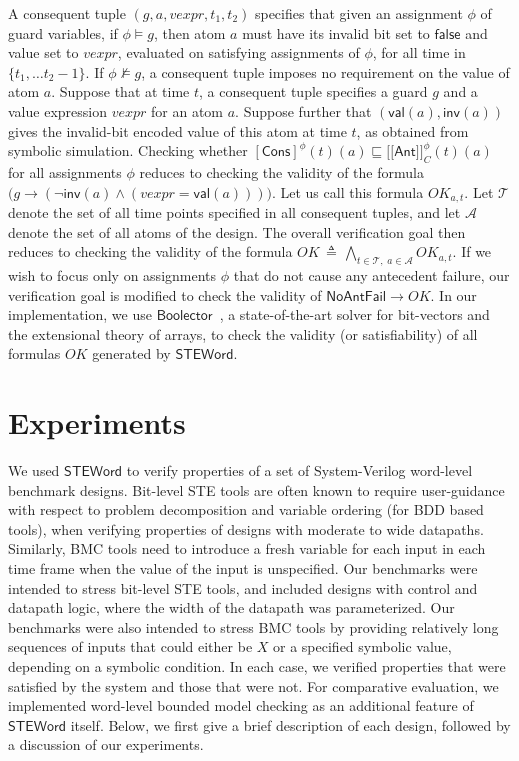 \documentclass{llncs}
\newcommand{\val}{\ensuremath{\mathsf{val}}}
\newcommand{\inv}{\ensuremath{\mathsf{inv}}}
\newcommand{\isdef}{\ensuremath{\,\triangleq\,}}
\newcommand{\lsem}{\ensuremath{[\![}}
\newcommand{\rsem}{\ensuremath{]\!]}}
\newcommand{\ant}{\ensuremath{\mathsf{Ant}}}
\newcommand{\NoAntFail}{\ensuremath{\mathsf{NoAntFail}}}
\newcommand{\cons}{\ensuremath{\mathsf{Cons}}}
\newcommand{\steword}{\ensuremath{\mathsf{STEWord}}}
\newcommand{\Boolector}{\ensuremath{\mathsf{Boolector}}}
\newcommand{\false}{\ensuremath{\mathsf{false}}}
\newcommand{\mc}[1]{\ensuremath{\mathcal{{#1}}}}
\begin{document}
A consequent tuple $(g, a, vexpr, t_1, t_2)$ specifies that given an
assignment $\phi$ of guard variables, if $\phi \models g$, then atom
$a$ must have its invalid bit set to ${\false}$ and value set to
$vexpr$, evaluated on satisfying assignments of $\phi$, for all time
in $\{t_1, \ldots t_2 - 1\}$.  If $\phi \not\models g$, a
consequent tuple imposes no requirement on the value of atom $a$.
Suppose that at time $t$, a consequent tuple specifies a guard $g$ and
a value expression $vexpr$ for an atom $a$.  Suppose further that
$({\val}(a), {\inv}(a))$ gives the invalid-bit encoded value of this
atom at time $t$, as obtained from symbolic simulation.  Checking
whether $[\cons]^\phi(t)(a) \sqsubseteq \lsem \ant \rsem_C^\phi(t)(a)$
for all assignments $\phi$ reduces to checking the validity of the
formula $\big(g \rightarrow (\neg{\inv}(a) \wedge (vexpr = {\val}(a)))
\big)$.  Let us call this formula $OK_{a, t}$.  Let $\mc{T}$ denote
the set of all time points specified in all consequent tuples, and let
$\mc{A}$ denote the set of all atoms of the design.  The overall
verification goal then reduces to checking the validity of the formula
$OK \isdef \bigwedge_{t \in \mc{T},\;a \in \mc{A}} OK_{a,t}$.  If we
wish to focus only on assignments $\phi$ that do not cause any
antecedent failure, our verification goal is modified to check the
validity of ${\NoAntFail} \rightarrow OK$.  In our implementation, we
use {\Boolector}~\cite{BrummayerBiere09}, a state-of-the-art solver
for bit-vectors and the extensional theory of arrays, to check the
validity (or satisfiability) of all formulas $OK$ generated by
{\steword}.

\section{Experiments}\label{sec:experiments}
We used {\steword} to verify properties of a set of System-Verilog
word-level benchmark designs.  Bit-level STE tools are often known to
require user-guidance with respect to problem decomposition and
variable ordering (for BDD based tools), when verifying properties of
designs with moderate to wide datapaths.  Similarly, BMC tools need to
introduce a fresh variable for each input in each time frame when the
value of the input is unspecified.  Our benchmarks were intended to
stress bit-level STE tools, and included designs with control and
datapath logic, where the width of the datapath was parameterized.
Our benchmarks were also intended to stress BMC tools by providing
relatively long sequences of inputs that could either be $X$ or a
specified symbolic value, depending on a symbolic condition.  In each
case, we verified properties that were satisfied by the system and
those that were not.  For comparative evaluation, we implemented
word-level bounded model checking as an additional feature of
{\steword} itself.  Below, we first give a brief description of each
design, followed by a discussion of our experiments.
\end{document}
